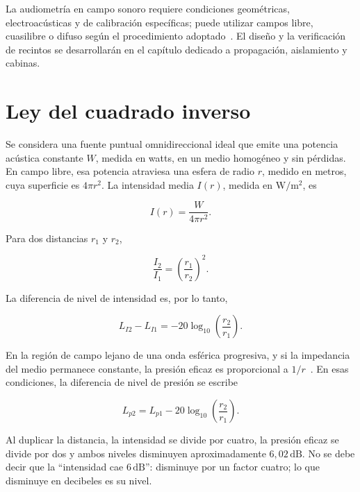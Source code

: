 La audiometría en campo sonoro requiere condiciones geométricas,
electroacústicas y de calibración específicas; puede utilizar campos libre,
cuasilibre o difuso según el procedimiento adoptado~\cite{iso8253_2_2009}. El diseño y la
verificación de recintos se desarrollarán en el capítulo dedicado a
propagación, aislamiento y cabinas.

\section{Ley del cuadrado inverso}
\label{sec:u4-cuadrado-inverso}

Se considera una fuente puntual omnidireccional ideal que emite una potencia
acústica constante \(W\), medida en watts, en un medio homogéneo y sin pérdidas.
En campo libre, esa potencia atraviesa una esfera de radio \(r\), medido en
metros, cuya superficie es \(4\pi r^2\). La intensidad media \(I(r)\), medida
en \(\text{W}/\text{m}^2\), es

\begin{equation}
    I(r)=\frac{W}{4\pi r^2}.
    \label{eq:u4-cuadrado-inverso}
\end{equation}

Para dos distancias \(r_1\) y \(r_2\),

\begin{equation}
    \frac{I_2}{I_1}
      =\left(\frac{r_1}{r_2}\right)^2.
    \label{eq:u4-razon-intensidades-distancia}
\end{equation}

La diferencia de nivel de intensidad es, por lo tanto,

\begin{equation}
    L_{I2}-L_{I1}
      =-20\log_{10}\!\left(\frac{r_2}{r_1}\right).
    \label{eq:u4-nivel-intensidad-distancia}
\end{equation}

En la región de campo lejano de una onda esférica progresiva, y si la
impedancia del medio permanece constante, la presión eficaz es proporcional a
\(1/r\)~\cite{xiangBlauert2021}. En esas condiciones, la diferencia de nivel de presión se escribe

\begin{equation}
    L_{p2}
      =L_{p1}-20\log_{10}\!\left(\frac{r_2}{r_1}\right).
    \label{eq:u4-nivel-presion-distancia}
\end{equation}

Al duplicar la distancia, la intensidad se divide por cuatro, la presión
eficaz se divide por dos y ambos niveles disminuyen aproximadamente
\(6{,}02\,\text{dB}\). No se debe decir que la ``intensidad cae
\(6\,\text{dB}\)'': disminuye por un factor cuatro; lo que disminuye en
decibeles es su nivel.

